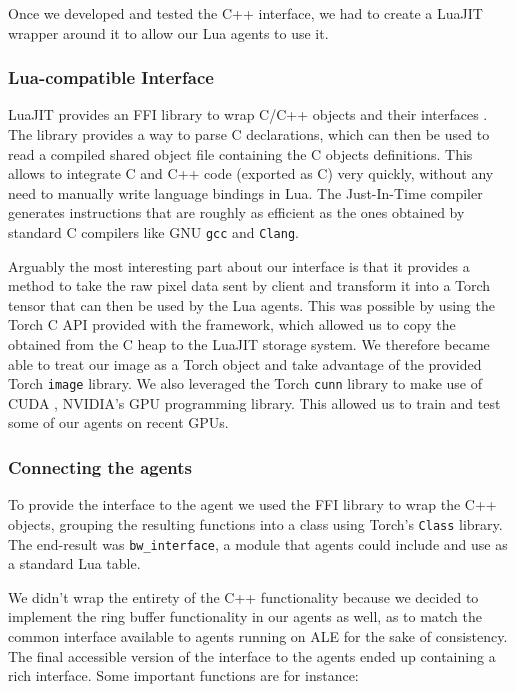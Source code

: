 Once we developed and tested the C++ interface, we had to create a LuaJIT
wrapper around it to allow our Lua agents to use it.

\subsubsection{Lua-compatible Interface}

LuaJIT provides an FFI library to wrap C/C++ objects and their interfaces
\citep{pall2008luajit}. The library provides a way to parse C declarations,
which can then be used to read a compiled shared object file containing the C
objects definitions. This allows to integrate C and C++ code (exported as C)
very quickly, without any need to manually write language bindings in Lua. The
Just-In-Time compiler generates instructions that are roughly as efficient
as the ones obtained by standard C compilers like GNU \texttt{gcc} and
\texttt{Clang}.

Arguably the most interesting part about our interface is that it provides a
method to take the raw pixel data sent by client and transform it into a Torch
tensor that can then be used by the Lua agents. This was possible by using the
Torch C API provided with the framework, which allowed us to copy the obtained
from the C heap to the LuaJIT storage system. We therefore became able to treat
our image as a Torch object and take advantage of the provided Torch
\texttt{image} library. We also leveraged the Torch \texttt{cunn} library to
make use of CUDA \citep{nvidia2008programming}, NVIDIA's GPU programming
library. This allowed us to train and test some of our agents on recent GPUs.

\subsubsection{Connecting the agents}

To provide the interface to the agent we used the FFI library to wrap the C++
objects, grouping the resulting functions into a class using Torch's
\texttt{Class} library. The end-result was \texttt{bw\_interface}, a module that agents could include
and use as a standard Lua table. 

We didn't wrap the entirety of the C++ functionality because we decided to
implement the ring buffer functionality in our agents as well, as to match the
common interface available to agents running on ALE for the sake of consistency.
The final accessible version of the interface to the agents ended up containing
a rich interface. Some important functions are for instance:

